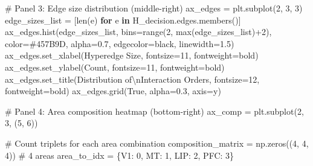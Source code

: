 \documentclass[
  11pt,
  letterpaper,
  oneside,
  openany]{book}
\newenvironment{Shaded}{\begin{snugshade}}{\end{snugshade}}
\newcommand{\BuiltInTok}[1]{\textcolor[rgb]{0.00,0.23,0.31}{#1}}
\newcommand{\CharTok}[1]{\textcolor[rgb]{0.13,0.47,0.30}{#1}}
\newcommand{\CommentTok}[1]{\textcolor[rgb]{0.37,0.37,0.37}{#1}}
\newcommand{\ControlFlowTok}[1]{\textcolor[rgb]{0.00,0.23,0.31}{\textbf{#1}}}
\newcommand{\DecValTok}[1]{\textcolor[rgb]{0.68,0.00,0.00}{#1}}
\newcommand{\FloatTok}[1]{\textcolor[rgb]{0.68,0.00,0.00}{#1}}
\newcommand{\KeywordTok}[1]{\textcolor[rgb]{0.00,0.23,0.31}{\textbf{#1}}}
\newcommand{\NormalTok}[1]{\textcolor[rgb]{0.00,0.23,0.31}{#1}}
\newcommand{\OperatorTok}[1]{\textcolor[rgb]{0.37,0.37,0.37}{#1}}
\newcommand{\StringTok}[1]{\textcolor[rgb]{0.13,0.47,0.30}{#1}}
\newcommand{\VariableTok}[1]{\textcolor[rgb]{0.07,0.07,0.07}{#1}}
\begin{document}
\begin{Shaded}
\begin{Highlighting}[]
\CommentTok{\# Panel 3: Edge size distribution (middle{-}right)}
\NormalTok{ax\_edges }\OperatorTok{=}\NormalTok{ plt.subplot(}\DecValTok{2}\NormalTok{, }\DecValTok{3}\NormalTok{, }\DecValTok{3}\NormalTok{)}
\NormalTok{edge\_sizes\_list }\OperatorTok{=}\NormalTok{ [}\BuiltInTok{len}\NormalTok{(e) }\ControlFlowTok{for}\NormalTok{ e }\KeywordTok{in}\NormalTok{ H\_decision.edges.members()]}
\NormalTok{ax\_edges.hist(edge\_sizes\_list, bins}\OperatorTok{=}\BuiltInTok{range}\NormalTok{(}\DecValTok{2}\NormalTok{, }\BuiltInTok{max}\NormalTok{(edge\_sizes\_list)}\OperatorTok{+}\DecValTok{2}\NormalTok{),}
\NormalTok{             color}\OperatorTok{=}\StringTok{\textquotesingle{}\#457B9D\textquotesingle{}}\NormalTok{, alpha}\OperatorTok{=}\FloatTok{0.7}\NormalTok{, edgecolor}\OperatorTok{=}\StringTok{\textquotesingle{}black\textquotesingle{}}\NormalTok{, linewidth}\OperatorTok{=}\FloatTok{1.5}\NormalTok{)}
\NormalTok{ax\_edges.set\_xlabel(}\StringTok{\textquotesingle{}Hyperedge Size\textquotesingle{}}\NormalTok{, fontsize}\OperatorTok{=}\DecValTok{11}\NormalTok{, fontweight}\OperatorTok{=}\StringTok{\textquotesingle{}bold\textquotesingle{}}\NormalTok{)}
\NormalTok{ax\_edges.set\_ylabel(}\StringTok{\textquotesingle{}Count\textquotesingle{}}\NormalTok{, fontsize}\OperatorTok{=}\DecValTok{11}\NormalTok{, fontweight}\OperatorTok{=}\StringTok{\textquotesingle{}bold\textquotesingle{}}\NormalTok{)}
\NormalTok{ax\_edges.set\_title(}\StringTok{\textquotesingle{}Distribution of}\CharTok{\textbackslash{}n}\StringTok{Interaction Orders\textquotesingle{}}\NormalTok{, fontsize}\OperatorTok{=}\DecValTok{12}\NormalTok{, fontweight}\OperatorTok{=}\StringTok{\textquotesingle{}bold\textquotesingle{}}\NormalTok{)}
\NormalTok{ax\_edges.grid(}\VariableTok{True}\NormalTok{, alpha}\OperatorTok{=}\FloatTok{0.3}\NormalTok{, axis}\OperatorTok{=}\StringTok{\textquotesingle{}y\textquotesingle{}}\NormalTok{)}

\CommentTok{\# Panel 4: Area composition heatmap (bottom{-}right)}
\NormalTok{ax\_comp }\OperatorTok{=}\NormalTok{ plt.subplot(}\DecValTok{2}\NormalTok{, }\DecValTok{3}\NormalTok{, (}\DecValTok{5}\NormalTok{, }\DecValTok{6}\NormalTok{))}

\CommentTok{\# Count triplets for each area combination}
\NormalTok{composition\_matrix }\OperatorTok{=}\NormalTok{ np.zeros((}\DecValTok{4}\NormalTok{, }\DecValTok{4}\NormalTok{, }\DecValTok{4}\NormalTok{))  }\CommentTok{\# 4 areas}
\NormalTok{area\_to\_idx }\OperatorTok{=}\NormalTok{ \{}\StringTok{\textquotesingle{}V1\textquotesingle{}}\NormalTok{: }\DecValTok{0}\NormalTok{, }\StringTok{\textquotesingle{}MT\textquotesingle{}}\NormalTok{: }\DecValTok{1}\NormalTok{, }\StringTok{\textquotesingle{}LIP\textquotesingle{}}\NormalTok{: }\DecValTok{2}\NormalTok{, }\StringTok{\textquotesingle{}PFC\textquotesingle{}}\NormalTok{: }\DecValTok{3}\NormalTok{\}}


\end{Highlighting}
\end{Shaded}
\end{document}

